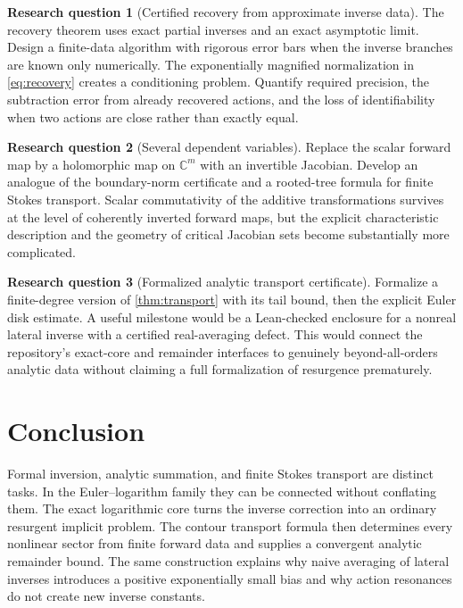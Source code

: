 \documentclass[11pt,a4paper]{article}
\numberwithin{equation}{section}
\theoremstyle{definition}
\newtheorem{problem}{Research question}
\theoremstyle{remark}
\newcommand{\C}{\mathbb C}
\begin{document}
\begin{problem}[Certified recovery from approximate inverse data]
The recovery theorem uses exact partial inverses and an exact asymptotic limit. Design a finite-data algorithm with rigorous error bars when the inverse branches are known only numerically. The exponentially magnified normalization in \eqref{eq:recovery} creates a conditioning problem. Quantify required precision, the subtraction error from already recovered actions, and the loss of identifiability when two actions are close rather than exactly equal.
\end{problem}

\begin{problem}[Several dependent variables]
Replace the scalar forward map by a holomorphic map on $\C^m$ with an invertible Jacobian. Develop an analogue of the boundary-norm certificate and a rooted-tree formula for finite Stokes transport. Scalar commutativity of the additive transformations survives at the level of coherently inverted forward maps, but the explicit characteristic description and the geometry of critical Jacobian sets become substantially more complicated.
\end{problem}

\begin{problem}[Formalized analytic transport certificate]
Formalize a finite-degree version of \cref{thm:transport} with its tail bound, then the explicit Euler disk estimate. A useful milestone would be a Lean-checked enclosure for a nonreal lateral inverse with a certified real-averaging defect. This would connect the repository's exact-core and remainder interfaces to genuinely beyond-all-orders analytic data without claiming a full formalization of resurgence prematurely.
\end{problem}

\section{Conclusion}
Formal inversion, analytic summation, and finite Stokes transport are distinct tasks. In the Euler--logarithm family they can be connected without conflating them. The exact logarithmic core turns the inverse correction into an ordinary resurgent implicit problem. The contour transport formula then determines every nonlinear sector from finite forward data and supplies a convergent analytic remainder bound. The same construction explains why naive averaging of lateral inverses introduces a positive exponentially small bias and why action resonances do not create new inverse constants.
\end{document}
